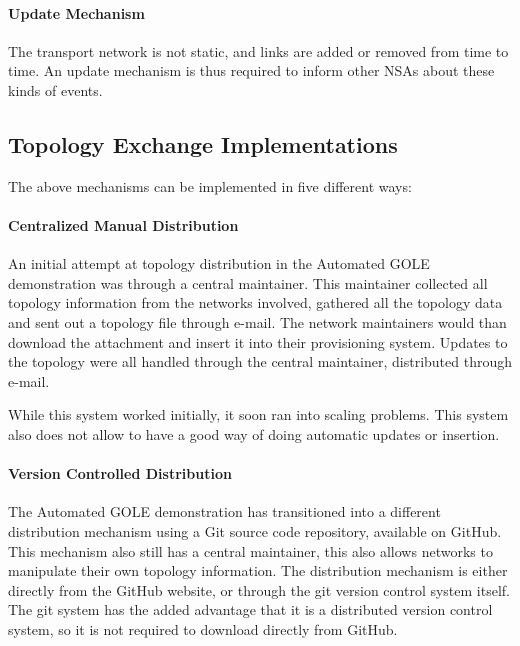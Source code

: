 \documentclass[12pt]{article}  %
\begin{document}
\paragraph{Update Mechanism}

 The transport network is not static, and links are added or removed 
from time to time. An update mechanism is thus required to inform other NSAs about 
these kinds of events.\label{h.uzmy62lgeii3}


\subsection{Topology Exchange Implementations}

 The above mechanisms can be implemented in five different ways:


\paragraph{Centralized Manual Distribution}
 An initial attempt at topology distribution in the Automated GOLE 
demonstration was through a central maintainer. This maintainer collected all topology 
information from the networks involved, gathered all the topology data and sent 
out a topology file through e-mail. The network maintainers would than download 
the attachment and insert it into their provisioning system. Updates to the topology 
were all handled through the central maintainer, distributed through e-mail.\label{h.31tbtceozcoc}


While this system worked initially, it soon ran into 
scaling problems. This system also does not allow to have a good way of doing automatic 
updates or insertion.


\paragraph{Version Controlled Distribution}

 The Automated GOLE demonstration has transitioned into a different 
distribution mechanism using a Git source code repository, available on GitHub. 
This mechanism also still has a central maintainer, this also allows networks to 
manipulate their own topology information. The distribution mechanism is either 
directly from the GitHub website, or through the git version control system itself. 
The git system has the added advantage that it is a distributed version control 
system, so it is not required to download directly from GitHub.\label{h.rtljwvhj8cbo}
\end{document}
